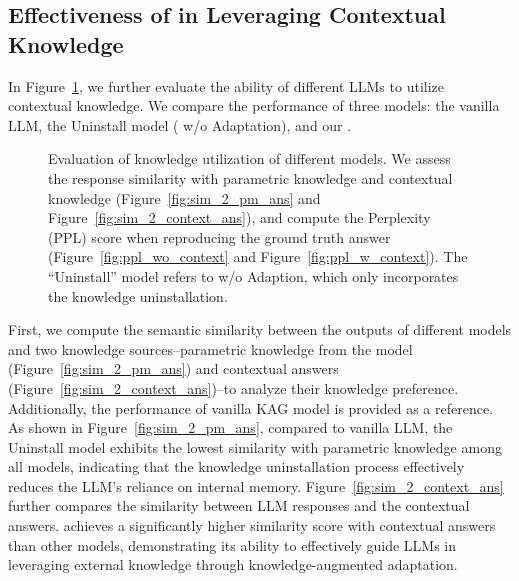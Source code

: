 
\subsection{Effectiveness of \method{} in Leveraging Contextual Knowledge} \label{sec:analysis}

In Figure~\ref{fig:analysis}, we further evaluate the ability of different LLMs to utilize contextual knowledge. We compare the performance of three models: the vanilla LLM, the Uninstall model (\method{} w/o Adaptation), and our \method{}.

\begin{figure}[!t]
    \centering
    
  \caption{Evaluation of knowledge utilization of different models. We assess the response similarity with parametric knowledge and contextual knowledge (Figure~\ref{fig:sim_2_pm_ans} and Figure~\ref{fig:sim_2_context_ans}), and compute the Perplexity (PPL) score when reproducing the ground truth answer (Figure~\ref{fig:ppl_wo_context} and Figure~\ref{fig:ppl_w_context}). The ``Uninstall'' model refers to \method{} w/o Adaption, which only incorporates the knowledge uninstallation.
  }
  \label{fig:analysis}
\end{figure}

First, we compute the semantic similarity between the outputs of different models and two knowledge sources--parametric knowledge from the model (Figure~\ref{fig:sim_2_pm_ans}) and contextual answers (Figure~\ref{fig:sim_2_context_ans})--to analyze their knowledge preference. Additionally, the performance of vanilla KAG model is provided as a reference. As shown in Figure~\ref{fig:sim_2_pm_ans}, compared to vanilla LLM, the Uninstall model exhibits the lowest similarity with parametric knowledge among all models, indicating that the knowledge uninstallation process effectively reduces the LLM's reliance on internal memory. Figure~\ref{fig:sim_2_context_ans} further compares the similarity between LLM responses and the contextual answers. \method{} achieves a significantly higher similarity score with contextual answers than other models, demonstrating its ability to effectively guide LLMs in leveraging external knowledge through knowledge-augmented adaptation.

